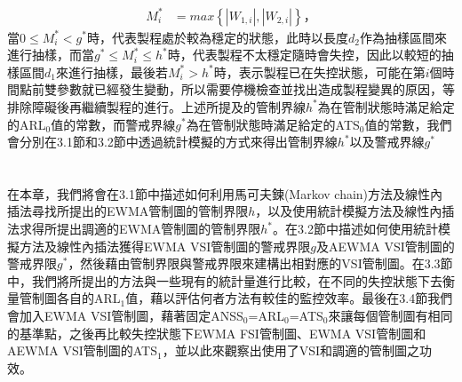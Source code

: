 \documentclass[12pt]{article}  %
\theoremstyle{plain}
\begin{document}
\begin{align}
M^*_{i}&=max\left\{|W_{1,i}|,|W_{2,i}|\right\}\mbox{，}
\end{align}
當$0 \leq M^*_{i}<g^*$時，代表製程處於較為穩定的狀態，此時以長度$d_2$作為抽樣區間來進行抽樣，而當$g^* \leq M^*_{i} \leq h^*$時，代表製程不太穩定隨時會失控，因此以較短的抽樣區間$d_1$來進行抽樣，最後若$M^*_{i}>h^*$時，表示製程已在失控狀態，可能在第$i$個時間點前雙參數就已經發生變動，所以需要停機檢查並找出造成製程變異的原因，等排除障礙後再繼續製程的進行。上述所提及的管制界線$h^*$為在管制狀態時滿足給定的ARL$_0$值的常數，而警戒界線$g^*$為在管制狀態時滿足給定的ATS$_0$值的常數，我們會分別在3.1節和3.2節中透過統計模擬的方式來得出管制界線$h^*$以及警戒界線$g^*$

\newpage
\section{}
在本章，我們將會在3.1節中描述如何利用馬可夫鍊(Markov chain)方法及線性內插法尋找所提出的EWMA管制圖的管制界限$h$，以及使用統計模擬方法及線性內插法求得所提出調適的EWMA管制圖的管制界限$h^*$。在3.2節中描述如何使用統計模擬方法及線性內插法獲得EWMA VSI管制圖的警戒界限$g$及AEWMA VSI管制圖的警戒界限$g^*$，然後藉由管制界限與警戒界限來建構出相對應的VSI管制圖。在3.3節中，我們將所提出的方法與一些現有的統計量進行比較，在不同的失控狀態下去衡量管制圖各自的ARL$_1$值，藉以評估何者方法有較佳的監控效率。最後在3.4節我們會加入EWMA VSI管制圖，藉著固定ANSS$_0$=ARL$_0$=ATS$_0$來讓每個管制圖有相同的基準點，之後再比較失控狀態下EWMA FSI管制圖、EWMA VSI管制圖和AEWMA VSI管制圖的ATS$_1$，並以此來觀察出使用了VSI和調適的管制圖之功效。
\end{document}
